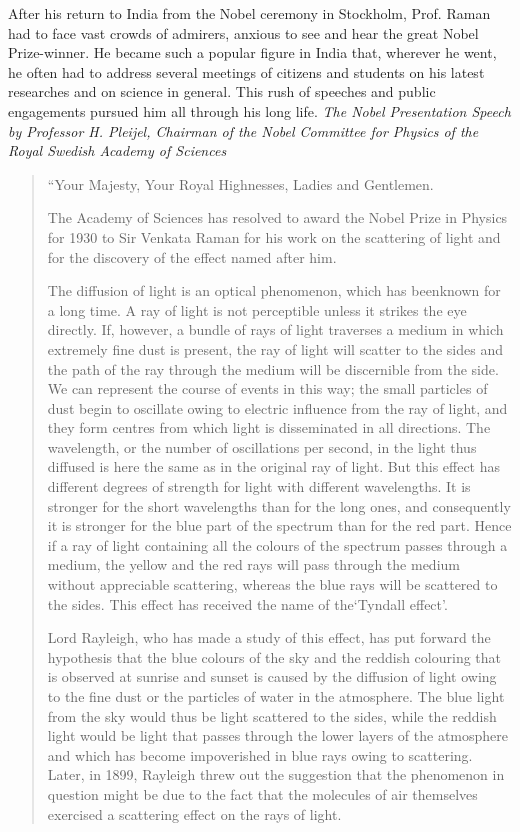 After his return to India from the Nobel ceremony in
Stockholm, Prof. Raman had to face vast crowds of admirers,
anxious to see and hear the great Nobel Prize-winner. He became
such a popular figure in India that, wherever he went, he often
had to address several meetings of citizens and students on his
latest researches and on science in general. This rush of speeches
and public engagements pursued him all through his long life.
{\em The Nobel Presentation Speech by Professor H. Pleijel,
Chairman of the Nobel Committee for Physics of the Royal
Swedish Academy of Sciences}
\begin{quote}
{\fontsize{10pt}{12pt}\selectfont
``Your Majesty, Your Royal Highnesses, Ladies and Gentlemen.

The Academy of Sciences has resolved to award the Nobel
Prize in Physics for 1930 to Sir Venkata Raman for his work on
the scattering of light and for the discovery of the effect named
after him.

The diffusion of light is an optical phenomenon, which has
been\break known for a long time. A ray of light is not perceptible unless
it strikes the eye directly. If, however, a bundle of rays of light
traverses a medium in which extremely fine dust is present, the
ray of light will scatter to the sides and the path of the ray through
the medium will be discernible from the side. We can represent
the course of events in this way; the small particles of dust begin
to oscillate owing to electric influence from the ray of light,
and they form centres from which light is disseminated in all
directions. The wavelength, or the number of oscillations per
second, in the light thus diffused is here the same as in the original
ray of light. But this effect has different degrees of strength for
light with different wavelengths. It is stronger for the short
wavelengths than for the long ones, and consequently it is stronger
for the blue part of the spectrum than for the red part. Hence
if a ray of light containing all the colours of the spectrum passes
through a medium, the yellow and the red rays will pass through
the medium without appreciable scattering, whereas the blue rays
will be scattered to the sides. This effect has received the name
of the\break `Tyndall effect'.

Lord Rayleigh, who has made a study of this effect, has put
forward the hypothesis that the blue colours of the sky and the
reddish colouring that is observed at sunrise and sunset is caused
by the diffusion of light owing to the fine dust or the particles
of water in the atmosphere. The blue light from the sky would
thus be light scattered to the sides, while the reddish light would
be light that passes through the lower layers of the atmosphere
and which has become impoverished in blue rays owing to
scattering. Later, in 1899, Rayleigh threw out the suggestion that
the phenomenon in question might be due to the fact that the
molecules of air themselves exercised a scattering effect on the
rays of light.

}
\end{quote}
